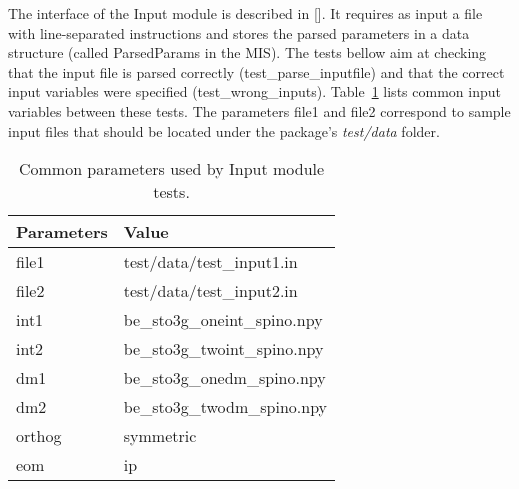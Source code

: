 \documentclass[12pt, titlepage]{article}
\begin{document}
The interface of the Input  module is described in [\cite{MIS2020}]. It 
requires as input a file with line-separated instructions and stores the parsed 
parameters in a data structure (called ParsedParams in the MIS). The tests 
bellow aim at checking that the input file is parsed correctly 
(test\_parse\_inputfile) and that the correct input variables were specified 
(test\_wrong\_inputs). Table~\ref{table:loaddata} lists common input variables 
between these tests. The parameters file1 and file2 correspond to sample input 
files that should be located under the package's \textit{test/data} folder.
\begin{table}[h!]
	\centering
	\begin{tabular}{ll}
		Parameters& Value\\
		\midrule
		file1& test/data/test\_input1.in\\
		file2 & test/data/test\_input2.in\\ 
		int1 & be\_sto3g\_oneint\_spino.npy\\
		int2 & be\_sto3g\_twoint\_spino.npy\\
		dm1 & be\_sto3g\_onedm\_spino.npy\\
		dm2 & be\_sto3g\_twodm\_spino.npy\\
		orthog& symmetric\\
		eom& ip\\
		\bottomrule
	\end{tabular}
	\caption{Common parameters used by Input module tests.}
	\label{table:loaddata}
\end{table}
\end{document}
